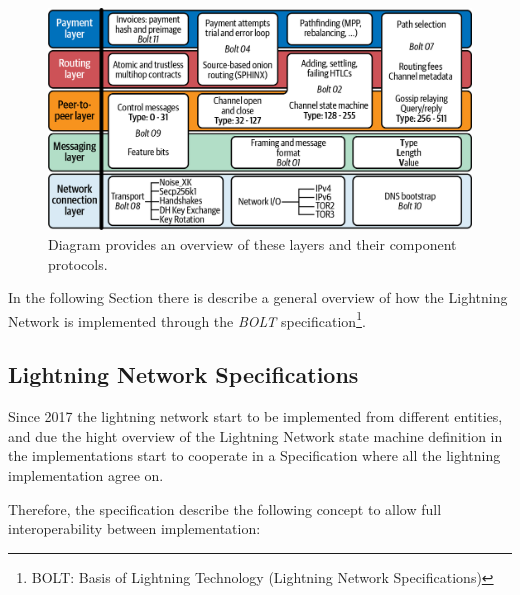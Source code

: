 \begin{figure}[h]
  \begin{center}
  \includegraphics[width=0.6\columnwidth]{imgs/mtln_0601.png}
  \end{center}
  \caption{Diagram provides an overview of these layers and their component protocols.}
  \label{fig:lightning-stack}
\end{figure}

In the following Section there is describe a general overview of how the Lightning Network is implemented through the
\emph{BOLT} specification\footnote{BOLT: Basis of Lightning Technology (Lightning Network Specifications)}.

\subsection{Lightning Network Specifications}

Since 2017 the lightning network start to be implemented from different entities,
and due the hight overview of the Lightning Network state machine definition in \cite{lightning-network-paper}
the implementations start to cooperate in a Specification where all the lightning implementation agree on.

Therefore, the specification describe the following concept to allow full interoperability between implementation:

